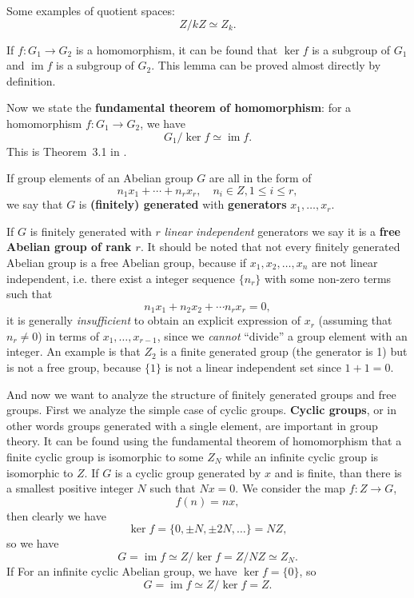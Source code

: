 \documentclass[hyperref, a4paper]{article}
\DeclareMathOperator{\im}{im}
\newcommand*{\concept}[1]{{\textbf{#1}}}
\def\mathbb#1{#1}%
\begin{document}
Some examples of quotient spaces:
\begin{equation}
    \mathbb{Z} / k \mathbb{Z} \simeq \mathbb{Z}_k.
\end{equation}

If $f: G_1 \to G_2$ is a homomorphism, it can be found that $\ker f$ is a subgroup of $G_1$ 
and $\im f$ is a subgroup of $G_2$. This lemma can be proved almost directly by definition.

Now we state the \concept{fundamental theorem of homomorphism}: for a homomorphism $f: G_1 \to G_2$, we have 
\begin{equation}
    G_1 / \ker f \simeq \im f.
\end{equation}
This is Theorem~3.1 in \cite{nakahara}. 

If group elements of an Abelian group $G$ are all in the form of 
\begin{equation}
    n_{1} x_{1}+\cdots+n_{r} x_{r}, \quad n_{i} \in \mathbb{Z}, 1 \leq i \leq r,
\end{equation}
we say that $G$ is \concept{(finitely) generated} with \concept{generators} $x_1, \ldots, x_r$.

If $G$ is finitely generated with $r$ \emph{linear independent} generators we say it is a 
\concept{free Abelian group of rank $r$}. 
It should be noted that not every finitely generated Abelian group is a free Abelian group, 
because if $x_1, x_2, \ldots, x_n$ are not linear independent, 
i.e. there exist a integer sequence $\{n_r\}$ with some non-zero terms such that 
\begin{equation}
    n_1 x_1 + n_2 x_2 + \cdots n_r x_r = 0,
\end{equation}
it is generally \emph{insufficient} to obtain an explicit expression of $x_r$ (assuming that $n_r \neq 0$) 
in terms of $x_1, \ldots, x_{r-1}$, since we \emph{cannot} ``divide'' a group element with an integer.
An example is that $\mathbb{Z}_2$ is a finite generated group (the generator is 1) but is not a free group,
because $\{1\}$ is not a linear independent set since $1 + 1 = 0$.

And now we want to analyze the structure of finitely generated groups and free groups. 
First we analyze the simple case of cyclic groups.
\concept{Cyclic groups}, or in other words groups generated with a single element, are important in group theory.
It can be found using the fundamental theorem of homomorphism that a finite cyclic group is isomorphic to 
some $\mathbb{Z}_N$ while an infinite cyclic group is isomorphic to $\mathbb{Z}$. 
If $G$ is a cyclic group generated by $x$ and is finite, than there is a smallest positive integer $N$ 
such that $Nx=0$. We consider the map $f: \mathbb{Z} \to G$,
\[
    f(n) = nx,
\]
then clearly we have 
\[
    \ker f = \{0, \pm N, \pm 2 N, \ldots\} = N \mathbb{Z},
\]
so we have 
\[
    G = \im f \simeq \mathbb{Z} / \ker f = \mathbb{Z} / N \mathbb{Z} \simeq \mathbb{Z}_N.
\]
If 
For an infinite cyclic Abelian group, we have $\ker f = \{0\}$, so 
\[
    G = \im f \simeq \mathbb{Z} / \ker f = \mathbb{Z}.
\]
\end{document}
